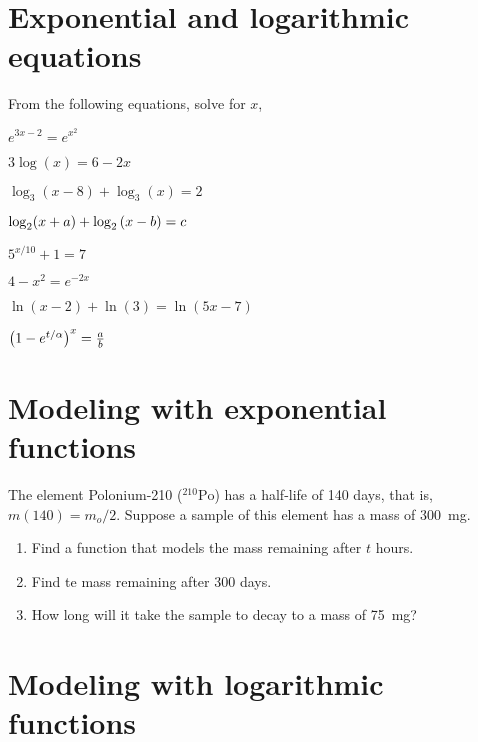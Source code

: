\documentclass[../main.tex]{subfiles}
\begin{document}
\section{Exponential and logarithmic equations}
From the following equations, solve for $x$,
\begin{enumerate}
    \begin{minipage}[c]{0.45\textwidth}
        \item $ e^{3x-2} = e^{x^2} $
        \item $ 3\log(x) = 6 -2x $
        \item $ \log_3(x-8) + \log_3(x) = 2 $
        \item $ \log_2(x+a) + \log_2\qty(x-b) = c $
    \end{minipage}
    \begin{minipage}[c]{0.45\textwidth}
        \item $ 5^{x/10}+1 = 7 $
        \item $ 4-x^2 = e^{-2x} $
        \item $ \ln(x-2) + \ln(3) = \ln(5x-7) $
        \item $\qty(1-e^{t/\alpha})^{x} = \frac{a}{b} $
    \end{minipage}
\end{enumerate}




\section{Modeling with exponential functions}

The element Polonium-210 ($^{210}\mathrm{Po}$) has a half-life of \num{140} days, that is, $m(140) = m_o/2$.
Suppose a sample of this element has a mass of \SI{300}{\milli\gram}.
\begin{enumerate}[label=(\alph*)]
    \item Find a function that models the mass remaining after $t$ hours.
    \item Find te mass remaining after \num{300} days. 
    \item How long will it take the sample to decay to a mass of \SI{75}{\milli\gram}?
\end{enumerate}



\section{Modeling with logarithmic functions}
\end{document}
